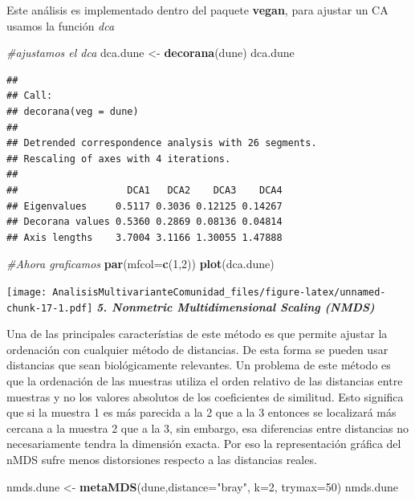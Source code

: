\documentclass[]{book}
\newenvironment{Shaded}{\begin{snugshade}}{\end{snugshade}}
\newcommand{\KeywordTok}[1]{\textcolor[rgb]{0.13,0.29,0.53}{\textbf{{#1}}}}
\newcommand{\DataTypeTok}[1]{\textcolor[rgb]{0.13,0.29,0.53}{{#1}}}
\newcommand{\DecValTok}[1]{\textcolor[rgb]{0.00,0.00,0.81}{{#1}}}
\newcommand{\StringTok}[1]{\textcolor[rgb]{0.31,0.60,0.02}{{#1}}}
\newcommand{\CommentTok}[1]{\textcolor[rgb]{0.56,0.35,0.01}{\textit{{#1}}}}
\newcommand{\NormalTok}[1]{{#1}}
\begin{document}
Este análisis es implementado dentro del paquete \textbf{vegan}, para
ajustar un CA usamos la función \emph{dca}

\begin{Shaded}
\begin{Highlighting}[]
\CommentTok{#ajustamos el dca}
\NormalTok{dca.dune <-}\StringTok{ }\KeywordTok{decorana}\NormalTok{(dune)}
\NormalTok{dca.dune}
\end{Highlighting}
\end{Shaded}

\begin{verbatim}
## 
## Call:
## decorana(veg = dune) 
## 
## Detrended correspondence analysis with 26 segments.
## Rescaling of axes with 4 iterations.
## 
##                   DCA1   DCA2    DCA3    DCA4
## Eigenvalues     0.5117 0.3036 0.12125 0.14267
## Decorana values 0.5360 0.2869 0.08136 0.04814
## Axis lengths    3.7004 3.1166 1.30055 1.47888
\end{verbatim}

\begin{Shaded}
\begin{Highlighting}[]
\CommentTok{#Ahora graficamos}
\KeywordTok{par}\NormalTok{(}\DataTypeTok{mfcol=}\KeywordTok{c}\NormalTok{(}\DecValTok{1}\NormalTok{,}\DecValTok{2}\NormalTok{))}
\KeywordTok{plot}\NormalTok{(dca.dune)}
\end{Highlighting}
\end{Shaded}

\texttt{[image: AnalisisMultivarianteComunidad\_files/figure-latex/unnamed-chunk-17-1.pdf]}
\textbf{\emph{5. Nonmetric Multidimensional Scaling (NMDS)}}

Una de las principales característias de este método es que permite
ajustar la ordenación con cualquier método de distancias. De esta forma
se pueden usar distancias que sean biológicamente relevantes. Un
problema de este método es que la ordenación de las muestras utiliza el
orden relativo de las distancias entre muestras y no los valores
absolutos de los coeficientes de similitud. Esto significa que si la
muestra 1 es más parecida a la 2 que a la 3 entonces se localizará más
cercana a la muestra 2 que a la 3, sin embargo, esa diferencias entre
distancias no necesariamente tendra la dimensión exacta. Por eso la
representación gráfica del nMDS sufre menos distorsiones respecto a las
distancias reales.

\begin{Shaded}
\begin{Highlighting}[]
\NormalTok{nmds.dune <-}\StringTok{ }\KeywordTok{metaMDS}\NormalTok{(dune,}\DataTypeTok{distance=}\StringTok{"bray"}\NormalTok{, }\DataTypeTok{k=}\DecValTok{2}\NormalTok{, }\DataTypeTok{trymax=}\DecValTok{50}\NormalTok{)   }
\NormalTok{nmds.dune }
\end{Highlighting}
\end{Shaded}
\end{document}
